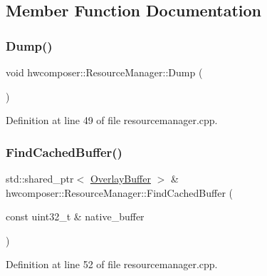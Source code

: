 \subsection{Member Function Documentation}
\mbox{\label{classhwcomposer_1_1ResourceManager_ade81dca6fb55a8e36f07802c6d9153d9}} 
\subsubsection{\texorpdfstring{Dump()}{Dump()}}
{\footnotesize\ttfamily void hwcomposer\+::\+Resource\+Manager\+::\+Dump (\begin{DoxyParamCaption}{ }\end{DoxyParamCaption})}



Definition at line 49 of file resourcemanager.\+cpp.


\begin{DoxyCode}{0}
\end{DoxyCode}
\mbox{\label{classhwcomposer_1_1ResourceManager_a011efc96d68e84a7a093b066078d76bb}} 
\subsubsection{\texorpdfstring{Find\+Cached\+Buffer()}{FindCachedBuffer()}}
{\footnotesize\ttfamily std\+::shared\+\_\+ptr$<$ \mbox{\hyperlink{classhwcomposer_1_1OverlayBuffer}{Overlay\+Buffer}} $>$ \& hwcomposer\+::\+Resource\+Manager\+::\+Find\+Cached\+Buffer (\begin{DoxyParamCaption}\item[{const uint32\+\_\+t \&}]{native\+\_\+buffer }\end{DoxyParamCaption})}



Definition at line 52 of file resourcemanager.\+cpp.


